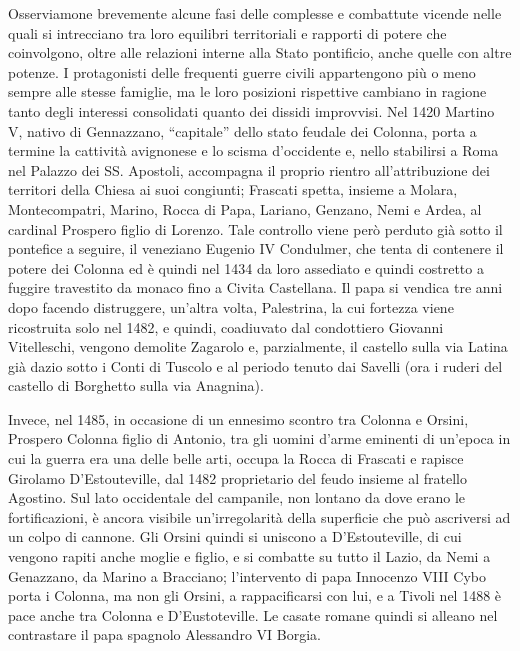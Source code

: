 \documentclass[
  letterpaper,
  DIV=11,
  numbers=noendperiod]{scrartcl}
\begin{document}
Osserviamone brevemente alcune fasi delle complesse e combattute vicende
nelle quali si intrecciano tra loro equilibri territoriali e rapporti di
potere che coinvolgono, oltre alle relazioni interne alla Stato
pontificio, anche quelle con altre potenze. I protagonisti delle
frequenti guerre civili appartengono più o meno sempre alle stesse
famiglie, ma le loro posizioni rispettive cambiano in ragione tanto
degli interessi consolidati quanto dei dissidi improvvisi. Nel 1420
Martino V, nativo di Gennazzano, ``capitale'' dello stato feudale dei
Colonna, porta a termine la cattività avignonese e lo scisma d'occidente
e, nello stabilirsi a Roma nel Palazzo dei SS. Apostoli, accompagna il
proprio rientro all'attribuzione dei territori della Chiesa ai suoi
congiunti; Frascati spetta, insieme a Molara, Montecompatri, Marino,
Rocca di Papa, Lariano, Genzano, Nemi e Ardea, al cardinal Prospero
figlio di Lorenzo. Tale controllo viene però perduto già sotto il
pontefice a seguire, il veneziano Eugenio IV Condulmer, che tenta di
contenere il potere dei Colonna ed è quindi nel 1434 da loro assediato e
quindi costretto a fuggire travestito da monaco fino a Civita
Castellana. Il papa si vendica tre anni dopo facendo distruggere,
un'altra volta, Palestrina, la cui fortezza viene ricostruita solo nel
1482, e quindi, coadiuvato dal condottiero Giovanni Vitelleschi, vengono
demolite Zagarolo e, parzialmente, il castello sulla via Latina già
dazio sotto i Conti di Tuscolo e al periodo tenuto dai Savelli (ora i
ruderi del castello di Borghetto sulla via Anagnina).

Invece, nel 1485, in occasione di un ennesimo scontro tra Colonna e
Orsini, Prospero Colonna figlio di Antonio, tra gli uomini d'arme
eminenti di un'epoca in cui la guerra era una delle belle arti, occupa
la Rocca di Frascati e rapisce Girolamo D'Estouteville, dal 1482
proprietario del feudo insieme al fratello Agostino. Sul lato
occidentale del campanile, non lontano da dove erano le fortificazioni,
è ancora visibile un'irregolarità della superficie che può ascriversi ad
un colpo di cannone. Gli Orsini quindi si uniscono a D'Estouteville, di
cui vengono rapiti anche moglie e figlio, e si combatte su tutto il
Lazio, da Nemi a Genazzano, da Marino a Bracciano; l'intervento di papa
Innocenzo VIII Cybo porta i Colonna, ma non gli Orsini, a rappacificarsi
con lui, e a Tivoli nel 1488 è pace anche tra Colonna e D'Eustoteville.
Le casate romane quindi si alleano nel contrastare il papa spagnolo
Alessandro VI Borgia.
\end{document}
